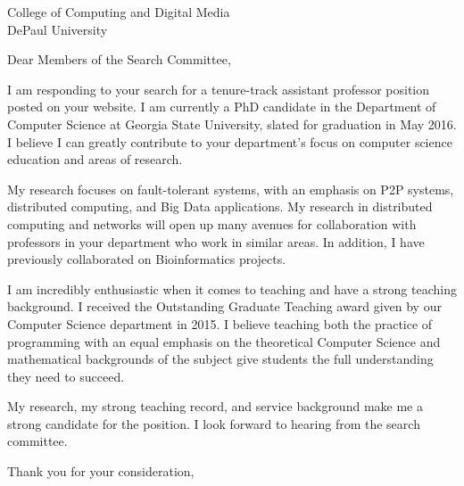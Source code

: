 \documentclass[12pt]{letter}
\date{}
\begin{document}
 
\begin{letter}{College of Computing and Digital Media\\DePaul University } 
\opening{Dear Members of the Search Committee,} 
 
I am responding to your search for a tenure-track assistant professor position posted on your website.
I am currently a PhD candidate in the Department of Computer Science at Georgia State University, slated for graduation in May 2016.
I believe I can greatly contribute to your department's focus on computer science education and areas of research.

My research focuses on fault-tolerant systems, with an emphasis on P2P systems, distributed computing, and Big Data applications.
My research in distributed computing and networks will open up many avenues for collaboration with professors in your department who work in similar areas.
In addition, I have previously collaborated on Bioinformatics projects.



I am incredibly enthusiastic when it comes to teaching and have a strong teaching background.
I received the Outstanding Graduate Teaching award given by our Computer Science department in 2015.
I believe teaching both the practice of programming with an equal emphasis on the theoretical Computer Science and mathematical backgrounds of the subject give students the full understanding they need to succeed.




My research, my strong teaching record, and service background make me a strong candidate for the position.
I look forward to hearing from the search committee.


\closing{Thank you for your consideration,} 
\end{letter} 
\end{document}
